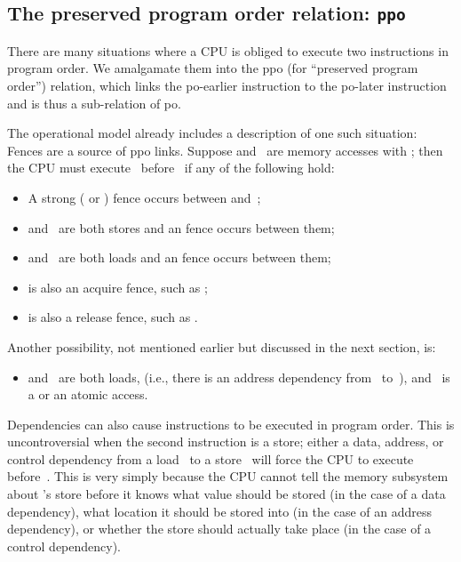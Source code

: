 \subsection{The preserved program order relation: \texttt{ppo}}
\label{sec:docs:explanation:The Preserved Program Order Relation: ppo}

There are many situations where a CPU is obliged to execute two
instructions in program order.
We amalgamate them into the ppo (for ``preserved program order'')
relation, which links the po-earlier instruction to the po-later
instruction and is thus a sub-relation of po.

The operational model already includes a description of one such
situation:
Fences are a source of ppo links.
Suppose  and~ are memory accesses with ;
then the CPU must execute~ before~ if any of the following hold:

\begin{itemize}
\item	A strong ( or ) fence occurs between
	 and~;

\item	{} and~ are both stores and an  fence occurs between
	them;

\item	{} and~ are both loads and an  fence occurs between
	them;

\item	{} is also an acquire fence, such as ;

\item	{} is also a release fence, such as .
\end{itemize}

Another possibility, not mentioned earlier but discussed in the next
section, is:

\begin{itemize}
\item	{} and~ are both loads,  (i.e., there is an address
	dependency from~ to~), and ~is a  or an atomic
	access.
\end{itemize}

Dependencies can also cause instructions to be executed in program
order.
This is uncontroversial when the second instruction is a
store; either a data, address, or control dependency from a load~ to
a store~ will force the CPU to execute  before~.
This is very
simply because the CPU cannot tell the memory subsystem about 's
store before it knows what value should be stored (in the case of a
data dependency), what location it should be stored into (in the case
of an address dependency), or whether the store should actually take
place (in the case of a control dependency).

